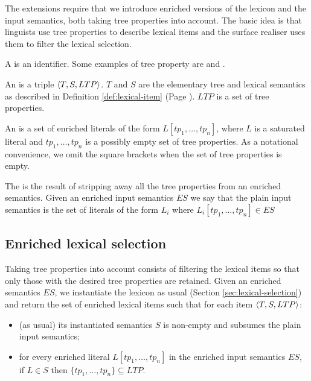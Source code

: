 The extensions require that we introduce enriched versions of the
lexicon and the input semantics, both taking tree properties into
account.  The basic idea is that linguists use tree properties to
describe lexical items and the surface realiser uses them to filter
the lexical selection.

\begin{definition}
A  is an identifier.  Some examples of tree
property are  and
.
\end{definition}

\begin{definition}
An  is a triple
$\langle T,S,LTP \rangle$.  $T$ and $S$ are the elementary tree and lexical
semantics as described in Definition \ref{def:lexical-item} (Page
\pageref{def:lexical-item}).  $LTP$ is a set of tree properties.
\end{definition}

\begin{definition}
An  is a set of enriched literals
of the form $L[tp_1,\ldots,tp_n]$, where $L$ is a saturated \ellyou
literal and $tp_1,\ldots,tp_n$ is a possibly empty set of tree
properties.  As a notational convenience, we omit the square brackets
when the set of tree properties is empty.
\end{definition}

\begin{definition}
The  is the result of stripping
away all the tree properties from an enriched semantics.  Given an
enriched input semantics $ES$ we say that the plain input semantics is
the set of literals of the form $L_i$ where $L_i[tp_1,\ldots,tp_n] \in
ES$
\end{definition}

\subsection{Enriched lexical selection}
\label{sec:extending-lexsel}

Taking tree properties into account consists of filtering the lexical
items so that only those with the desired tree properties are retained.
Given an enriched semantics $ES$,  we instantiate the lexicon as usual
(Section \ref{sec:lexical-selection}) and return the set of enriched
lexical items such that for each item $\langle T,S,LTP \rangle$:
\begin{itemize}
\item (as usual) its instantiated semantics $S$ is non-empty and subsumes the plain
      input semantics;
\item for every enriched literal $L[tp_1,\ldots,tp_n]$ in the enriched
      input semantics $ES$, if $L \in S$ then $\{tp_1,\ldots,tp_n\}
      \subseteq LTP$.
\end{itemize}

